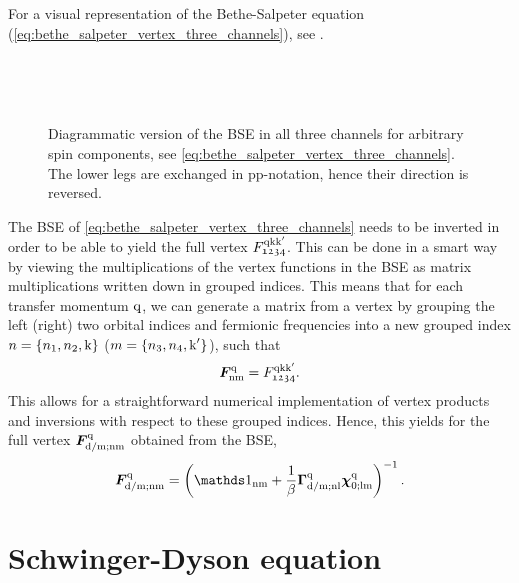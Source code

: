 \documentclass[\main/main.tex]{subfiles}
\begin{document}
For a visual representation of the Bethe-Salpeter equation (\ref{eq:bethe_salpeter_vertex_three_channels}), see .
\begin{figure}[ht!]
  \centering
  \parbox{\textwidth}{
    \subfloat{}
  }\\[1cm]
  \parbox{\textwidth}{
    \subfloat{}
  }\\[1cm]
  \parbox{\textwidth}{
    \subfloat{}
  }
  \caption{Diagrammatic version of the BSE in all three channels for arbitrary spin components, see \eqref{eq:bethe_salpeter_vertex_three_channels}. The lower legs are exchanged in pp-notation, hence their direction is reversed.}
  \label{fig:bethe_salpeter_diagrammatic}
\end{figure}
The BSE of \eqref{eq:bethe_salpeter_vertex_three_channels} needs to be inverted in order to be able to yield the full vertex $F_{\mathfrak{1234}}^{\text{q}\text{k}\text{k}'}$. This can be done in a smart way by viewing the multiplications of the vertex functions in the BSE as matrix multiplications written down in grouped indices. This means that for each transfer momentum $\text{q}$, we can generate a matrix from a vertex by grouping the left (right) two orbital indices and fermionic frequencies into a new grouped index $n=\{n_1, n_2, \text{k}\}$ ($m=\{n_3, n_4, \text{k}'\}$), such that \cite{Galler2017} 
\begin{align}
	\bm{F}^{\text{q}}_{\text{nm}}=F^{\text{q}\text{k}\text{k}'}_{\mathfrak{1234}}.
\end{align}
This allows for a straightforward numerical implementation of vertex products and inversions with respect to these grouped indices. Hence, this yields for the full vertex $\bm{F}^{\text{q}}_{\text{d}/\text{m};\text{nm}}$ obtained from the BSE,
\begin{align}
	\bm{F}^{\q}_{\dens/\magn;\text{nm}}=\left (\unity_{\text{nm}} +\frac1\beta \bm{\Gamma}^{\q}_{\dens/\magn;\text{nl}}\bm{\chi}^{\q}_{0;\text{lm}}\right )^{-1}.
\end{align}

\section{Schwinger-Dyson equation}\label{sec:schwinger_dyson}
\end{document}
